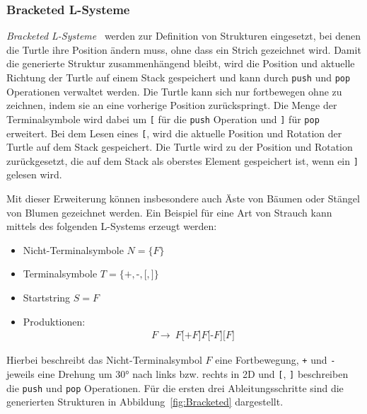 \subsubsection{Bracketed L-Systeme}
\textit{Bracketed L-Systeme}~\cite*{Shaker2016} werden zur Definition von Strukturen eingesetzt, bei denen die Turtle ihre Position ändern muss, ohne dass ein Strich gezeichnet wird.
Damit die generierte Struktur zusammenhängend bleibt, wird die Position und aktuelle Richtung der Turtle auf einem Stack gespeichert und kann durch \texttt{push} und \texttt{pop} Operationen verwaltet werden.
Die Turtle kann sich nur fortbewegen ohne zu zeichnen, indem sie an eine vorherige Position zurückspringt.
Die Menge der Terminalsymbole wird dabei um \texttt{[} für die \texttt{push} Operation und \texttt{]} für \texttt{pop} erweitert.
Bei dem Lesen eines \texttt{[}, wird die aktuelle Position und Rotation der Turtle auf dem Stack gespeichert.
Die Turtle wird zu der Position und Rotation zurückgesetzt, die auf dem Stack als oberstes Element gespeichert ist, wenn ein \texttt{]} gelesen wird.

Mit dieser Erweiterung können insbesondere auch Äste von Bäumen oder Stängel von Blumen gezeichnet werden.
Ein Beispiel für eine Art von Strauch kann mittels des folgenden L-Systems erzeugt werden:
\begin{itemize}
    \item Nicht-Terminalsymbole $N=\{F\}$
    \item Terminalsymbole $T=\{\texttt{+},\texttt{-},\texttt{[},\texttt{]}\}$
    \item Startstring $S=F$
    \item Produktionen:
          \begin{align*}
              F\rightarrow~F\texttt{[+}F\texttt{]}F\texttt{[-}F\texttt{]}\texttt{[}F\texttt{]}
          \end{align*}
\end{itemize}

Hierbei beschreibt das Nicht-Terminalsymbol $F$ eine Fortbewegung, \texttt{+} und \texttt{-} jeweils eine Drehung um \ang{30} nach links bzw. rechts in 2D und \texttt{[}, \texttt{]} beschreiben die \texttt{push} und \texttt{pop} Operationen.
Für die ersten drei Ableitungsschritte sind die generierten Strukturen in Abbildung~\ref{fig:Bracketed} dargestellt.

